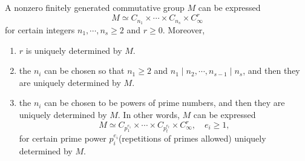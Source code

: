 \begin{theorem}
  \label{theorem-decomposition-of-finite-generated-commutative-group}
  A nonzero finitely generated commutative group \( M \) can be expressed
  \[
    M \simeq C_{n_1} \times \cdots \times C_{n_s} \times C^r_\infty
  \]
  for certain integers \( n_1, \cdots, n_s \geq 2 \) and \( r \geq 0 \).
  Moreover,
  \begin{enumerate}
    \item \( r \) is uniquely determined by \( M \).
    \item the \( n_i \) can be chosen so that \( n_1 \geq 2 \) and \( n_1 \mid n_2, \cdots, n_{s - 1} \mid n_s \), and then they are uniquely determined by \( M \).
    \item the \( n_i \) can be chosen to be powers of prime numbers, and then they are uniquely determined by \( M \).
      In other words, \( M \) can be expressed
        \begin{equation}
            M \simeq C_{p^{e_1}_1} \times \cdots \times C_{p^{e_t}_t} \times C^r_\infty,\quad e_i \geq 1, \label{equation-elementary-decomposition}
        \end{equation}
      for certain prime power \( p^{e_i}_i \)(repetitions of primes allowed) uniquely determined by \( M \).
  \end{enumerate}
\end{theorem}

